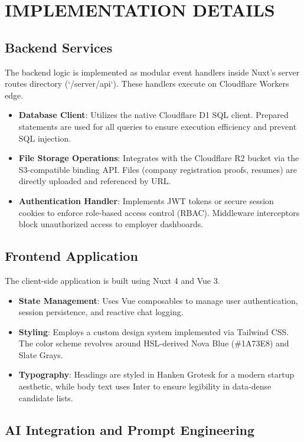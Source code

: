 \documentclass[12pt,a4paper]{report}
\begin{document}
\chapter{IMPLEMENTATION DETAILS}

\section{Backend Services}

The backend logic is implemented as modular event handlers inside Nuxt's server routes directory (`/server/api`). These handlers execute on Cloudflare Workers edge.
\begin{itemize}
    \item \textbf{Database Client}: Utilizes the native Cloudflare D1 SQL client. Prepared statements are used for all queries to ensure execution efficiency and prevent SQL injection.
    \item \textbf{File Storage Operations}: Integrates with the Cloudflare R2 bucket via the S3-compatible binding API. Files (company registration proofs, resumes) are directly uploaded and referenced by URL.
    \item \textbf{Authentication Handler}: Implements JWT tokens or secure session cookies to enforce role-based access control (RBAC). Middleware interceptors block unauthorized access to employer dashboards.
\end{itemize}

\section{Frontend Application}

The client-side application is built using Nuxt 4 and Vue 3.
\begin{itemize}
    \item \textbf{State Management}: Uses Vue composables to manage user authentication, session persistence, and reactive chat logging.
    \item \textbf{Styling}: Employs a custom design system implemented via Tailwind CSS. The color scheme revolves around HSL-derived Nova Blue (\#1A73E8) and Slate Grays.
    \item \textbf{Typography}: Headings are styled in Hanken Grotesk for a modern startup aesthetic, while body text uses Inter to ensure legibility in data-dense candidate lists.
\end{itemize}

\section{AI Integration and Prompt Engineering}
\end{document}
